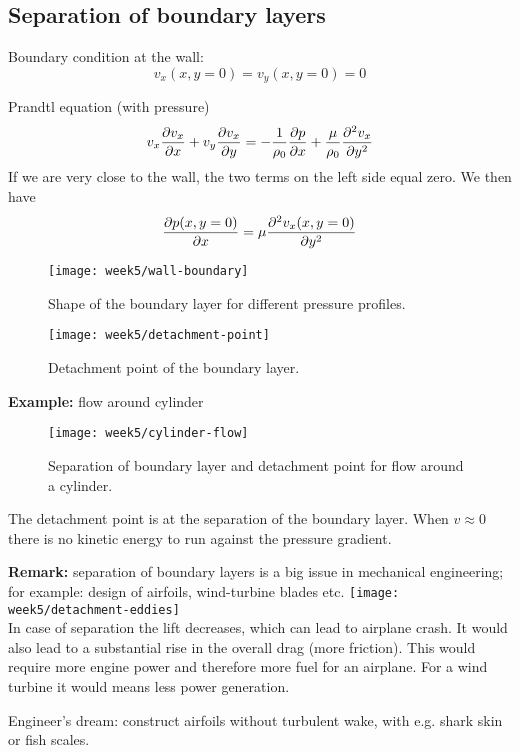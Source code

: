 \subsection{Separation of boundary layers}
Boundary condition at the wall:
\begin{equation}
v_x(x,y=0) = v_y(x,y=0)=0
\end{equation}

Prandtl equation (with pressure)
\begin{equation}
v_x\frac{\partial v_x}{\partial x}+v_y\frac{\partial v_x}{\partial y} = -\frac{1}{\rho_0}\frac{\partial p}{\partial x}+\frac{\mu}{\rho_0}\frac{\partial^2 v_x}{\partial y^2}
\end{equation}
If we are very close to the wall, the two terms on the left side equal zero. We then have
\begin{equation}
\frac{\partial p(x,y=0)}{\partial x}=\mu\frac{\partial^2 v_x(x,y=0)}{\partial y^2}
\end{equation}

\begin{figure}[!h]
    \centering
    \texttt{[image: week5/wall-boundary]}\\
    \caption{Shape of the boundary layer for different pressure profiles.}
    \label{fig:wall-boundary}
\end{figure}

\begin{figure}[!h]
    \centering
    \texttt{[image: week5/detachment-point]}\\
    \caption{Detachment point of the boundary layer.}
    \label{fig:detachment-point}
\end{figure}

\newpage
\textbf{Example:} flow around cylinder

\begin{figure}[!h]
    \centering
    \texttt{[image: week5/cylinder-flow]}\\
    \caption{Separation of boundary layer and detachment point for flow around a cylinder.}
    \label{fig:cylinder-flow}
\end{figure}

The detachment point is at the separation of the boundary layer. When $v\approx0$ there is no kinetic energy to run against the pressure gradient.

\begin{framed}
\textbf{Remark:} separation of boundary layers is a big issue in mechanical engineering; for example: design of airfoils, wind-turbine blades etc.
{\center
\texttt{[image: week5/detachment-eddies]}\\
}
In case of separation the lift decreases, which can lead to airplane crash. It would also lead to a substantial rise in the overall drag (more friction). This would require more engine power and therefore more fuel for an airplane. For a wind turbine it would means less power generation.

Engineer's dream: construct airfoils without turbulent wake, with e.g. shark skin or fish scales.
\end{framed}


